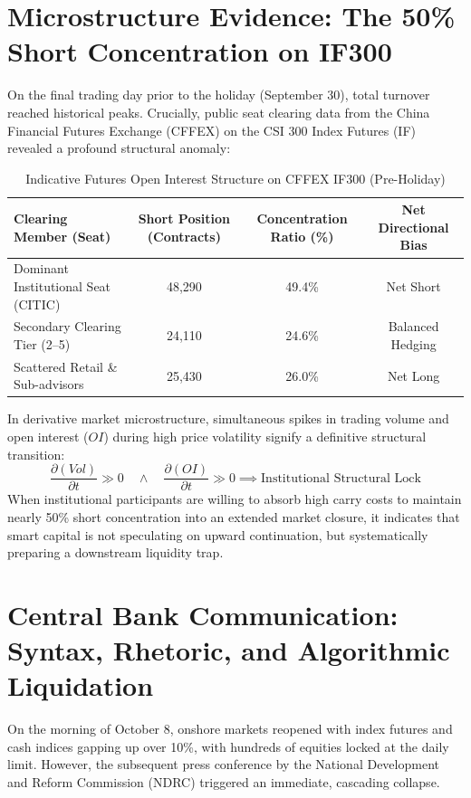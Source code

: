 \documentclass[11pt,a4paper]{article}
\begin{document}
\section{Microstructure Evidence: The 50\% Short Concentration on IF300}

On the final trading day prior to the holiday (September 30), total turnover reached historical peaks. Crucially, public seat clearing data from the China Financial Futures Exchange (CFFEX) on the CSI 300 Index Futures (IF) revealed a profound structural anomaly:

\begin{table}[h]
\centering
\small
\caption{Indicative Futures Open Interest Structure on CFFEX IF300 (Pre-Holiday)}
\label{tab:futures_oi}
\begin{tabular}{@{}lccc@{}}
\toprule
\textbf{Clearing Member (Seat)} & \textbf{Short Position (Contracts)} & \textbf{Concentration Ratio (\%)} & \textbf{Net Directional Bias} \\ \midrule
Dominant Institutional Seat (CITIC) & 48,290 & 49.4\% & Net Short \\
Secondary Clearing Tier (2--5) & 24,110 & 24.6\% & Balanced Hedging \\
Scattered Retail \& Sub-advisors & 25,430 & 26.0\% & Net Long \\ \bottomrule
\end{tabular}
\end{table}

In derivative market microstructure, simultaneous spikes in trading volume and open interest ($OI$) during high price volatility signify a definitive structural transition:
\begin{equation}
    \frac{\partial (Vol)}{\partial t} \gg 0 \quad \land \quad \frac{\partial (OI)}{\partial t} \gg 0 \implies \text{Institutional Structural Lock}
\end{equation}
When institutional participants are willing to absorb high carry costs to maintain nearly 50\% short concentration into an extended market closure, it indicates that smart capital is not speculating on upward continuation, but systematically preparing a downstream liquidity trap.

\section{Central Bank Communication: Syntax, Rhetoric, and Algorithmic Liquidation}

On the morning of October 8, onshore markets reopened with index futures and cash indices gapping up over 10\%, with hundreds of equities locked at the daily limit. However, the subsequent press conference by the National Development and Reform Commission (NDRC) triggered an immediate, cascading collapse.
\end{document}
